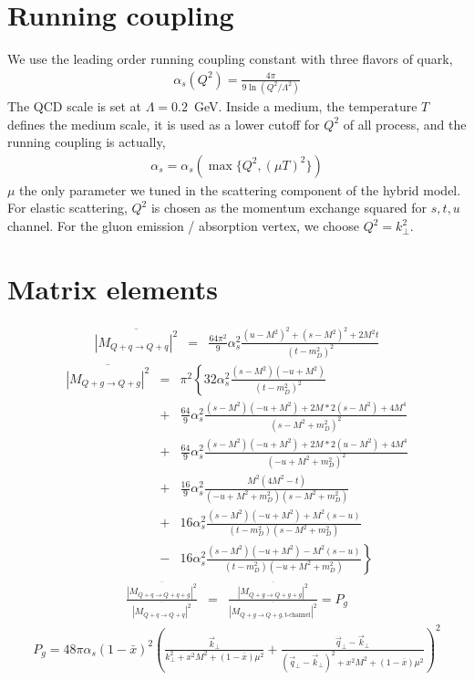 \documentclass[aps, prc, reprint, amsmath, groupedaddress, nofootinbib]{revtex4-1}
\begin{document}
\begin{appendices}
\section{Running coupling}
We use the leading order running coupling constant with three flavors of quark,
\begin{eqnarray}
\alpha_s(Q^2) = \frac{4\pi}{9 \ln\left(Q^2/\Lambda^2\right) }
\end{eqnarray}
The QCD scale is set at $\Lambda = 0.2$~GeV.
Inside a medium, the temperature $T$ defines the medium scale, it is used as a lower cutoff for $Q^2$ of all process, and the running coupling is actually,
\begin{eqnarray}
\alpha_s = \alpha_s(\max\{Q^2,(\mu T)^2\})
\end{eqnarray}
$\mu$ the only parameter we tuned in the scattering component of the hybrid model.
For elastic scattering, $Q^2$ is chosen as the momentum exchange squared for $s,t,u$ channel.
For the gluon emission / absorption vertex, we choose $Q^2 = k_\perp^2$.


\section{Matrix elements}
\label{appendix:matrix-element}
\begin{widetext}
\begin{eqnarray}
\overline{|M_{Q+q\rightarrow Q+q}|^2} &=& \frac{64\pi^2}{9}\alpha_s^2 \frac{(u-M^2)^2 + (s-M^2)^2 + 2 M^2 t}{(t-m_D^2)^2}
\end{eqnarray}
\begin{eqnarray}
\overline{|M_{Q+g\rightarrow Q+g}|^2} &=& \pi^2 \left\{
32\alpha_s^2 \frac{(s-M^2)(-u+M^2)}{(t-m_D^2)^2} \right. \\ \nonumber
&+&\frac{64}{9}\alpha_s^2 \frac{(s-M^2)(-u+M^2)+2M*2(s-M^2) + 4M^4}{(s-M^2+m_D^2)^2} \\ \nonumber
&+&\frac{64}{9}\alpha_s^2 \frac{(s-M^2)(-u+M^2)+2M*2(u-M^2) + 4M^4}{(-u+M^2+m_D^2)^2} \\ \nonumber
&+&\frac{16}{9}\alpha_s^2 \frac{M^2(4M^2 - t)}{(-u+M^2+m_D^2)(s-M^2+m_D^2)} \\ \nonumber
&+& 16 \alpha_s^2 \frac{(s-M^2)(-u+M^2)+M^2(s-u)}{(t-m_D^2)(s-M^2+m_D^2)} \\ \nonumber
&-& \left. 16 \alpha_s^2 \frac{(s-M^2)(-u+M^2)-M^2(s-u)}{(t-m_D^2)(-u+M^2+m_D^2)}\right\} 
\end{eqnarray}
\begin{eqnarray}
\frac{\overline{|M_{Q+q\rightarrow Q+q+g}|^2}}{\overline{|M_{Q+q\rightarrow Q+q}|^2}} &=&  \frac{\overline{|M_{Q+g\rightarrow Q+g+g}|^2}}{\overline{|M_{Q+g\rightarrow Q+g, \textrm{t-channel}}|^2}} = P_g
\end{eqnarray}
\begin{eqnarray}
P_g = 48 \pi \alpha_s (1-\bar{x})^2 \left(\frac{\vec{k}_\perp}{k_\perp^2 + x^2 M^2 + (1-\bar{x})\mu^2} 
+ \frac{\vec{q}_\perp - \vec{k}_\perp}{(\vec{q}_\perp-\vec{k}_\perp)^2 + x^2 M^2 + (1-\bar{x})\mu^2}
\right)^2 
\end{eqnarray}
\end{widetext}


\end{appendices}
\end{document}
